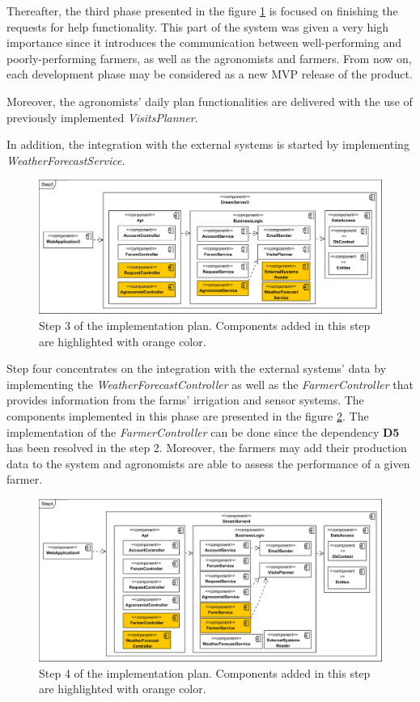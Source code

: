 Thereafter, the third phase presented in the figure \ref{fig:step3} is focused on finishing the requests for help functionality. This part of the system was given a very high importance since it introduces the communication between well-performing and poorly-performing farmers, as well as the agronomists and farmers. From now on, each development phase may be considered as a new MVP release of the product.

Moreover, the agronomists' daily plan functionalities are delivered with the use of previously implemented \textit{VisitsPlanner}.

In addition, the integration with the external systems is started by implementing \textit{WeatherForecastService}.

\begin{figure}[H]
    \centering
    \includegraphics[width=\textwidth]
    {diagrams/implementation-plan/Step3.png}
    \caption{Step 3 of the implementation plan. Components added in this step are highlighted with orange color.}
    \label{fig:step3}
\end{figure}

Step four concentrates on the integration with the external systems' data by implementing the \textit{WeatherForecastController} as well as the \textit{FarmerController} that provides information from the farms' irrigation and sensor systems. The components implemented in this phase are presented in the figure \ref{fig:step4}. The implementation of the \textit{FarmerController} can be done since the dependency \textbf{D5} has been resolved in the step 2. Moreover, the farmers may add their production data to the system and agronomists are able to assess the performance of a given farmer.

\begin{figure}[H]
    \centering
    \includegraphics[width=\textwidth]
    {diagrams/implementation-plan/Step4.png}
    \caption{Step 4 of the implementation plan. Components added in this step are highlighted with orange color.}
    \label{fig:step4}
\end{figure}

